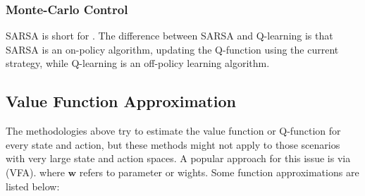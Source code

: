 \documentclass[12pt]{report}
\begin{document}
\subsubsection{Monte-Carlo Control}
SARSA is short for . The difference between SARSA and Q-learning is that SARSA is
an on-policy algorithm, updating the Q-function using the current strategy, while Q-learning is an off-policy learning algorithm.

\subsection{Value Function Approximation}

The methodologies above try to estimate the value function or Q-function for every state and action, but these methods might not apply to those
scenarios with very large state and action spaces. A popular approach for this issue is via (VFA).
where $\mathbf{w}$ refers to parameter or wights. Some function approximations are listed below:
\end{document}
